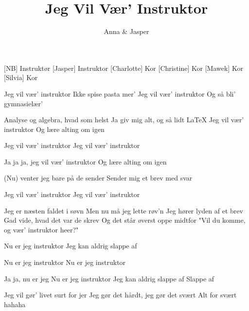 \documentclass[a4paper,11pt]{article}
\title{Jeg Vil Vær' Instruktor}
\author{Anna \& Jasper}
\begin{document}
\maketitle

\begin{roles}
[NB] Instruktør
[Jasper] Instruktor
[Charlotte] Kor
[Christine] Kor
[Mawek] Kor
[Silvia] Kor
\end{roles}

\begin{song}

 Jeg vil vær' instruktor
Ikke spise pasta mer'
Jeg vil vær' instruktor
Og så bli' gymnasielær'

  Analyse og algebra, hvad som helst
Ja giv mig alt, og så lidt LaTeX
Jeg vil vær' instruktor
Og lære alting om igen

 Jeg vil vær' instruktor
Jeg vil vær' instruktor

 Ja ja ja, jeg vil vær' instruktor
Og lære alting om igen

 (Nu) venter jeg bare på de sender
Sender mig et brev med svar

 Jeg vil vær’ instruktor
Jeg vil vær’ instruktor

 Jeg er næsten faldet i søvn
Men nu må jeg lette røv'n
Jeg hører lyden af et brev
Gad vide, hvad det var de skrev
Og det står øverst oppe midtfor
"Vil du komme, og vær' instruktor heer?"

 Nu er jeg instruktor
Jeg kan aldrig slappe af

 Nu er jeg instruktor
Nu er jeg instruktor

 Ja ja, nu er jeg
Nu er jeg instruktor
Jeg kan aldrig slappe af
 Slappe af

 Jeg vil gør’ livet surt for jer
Jeg gør det hårdt, jeg gør det svært
Alt for svært
hahaha

\end{song}
\end{document}
